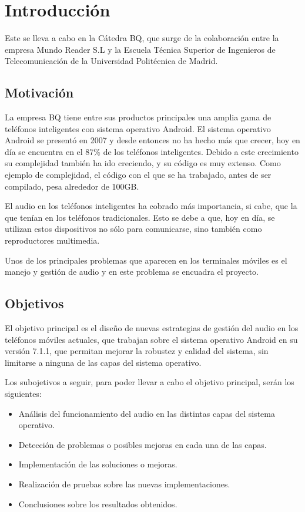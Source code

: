 \chapter{Introducción}
Este  se lleva a cabo en la Cátedra BQ, que surge de la colaboración entre la empresa Mundo Reader S.L y la Escuela Técnica Superior de Ingenieros de Telecomunicación de la Universidad Politécnica de Madrid.

\section{Motivación}
La empresa BQ tiene entre sus productos principales una amplia gama de teléfonos inteligentes con sistema operativo Android. El sistema operativo Android se presentó en 2007 y desde entonces no ha hecho más que crecer, hoy en día se encuentra en el 87\% de los teléfonos inteligentes. Debido a este crecimiento su complejidad también ha ido creciendo, y su código es muy extenso. Como ejemplo de complejidad, el código con el que se ha trabajado, antes de ser compilado, pesa alrededor de 100\gls{GB}.

El audio en los teléfonos inteligentes ha cobrado más importancia, si cabe, que la que tenían en los teléfonos tradicionales. Esto se debe a que, hoy en día, se utilizan estos dispositivos no sólo para comunicarse, sino también como reproductores multimedia.

Unos de los principales problemas que aparecen en los terminales móviles es el manejo y gestión de audio y en este problema se encuadra el proyecto.

\section{Objetivos}
El objetivo principal es el diseño de nuevas estrategias de gestión del audio en los teléfonos móviles actuales, que trabajan sobre el sistema operativo Android en su versión 7.1.1, que permitan mejorar la robustez y calidad del sistema, sin limitarse a ninguna de las capas del sistema operativo.

Los subojetivos a seguir, para poder llevar a cabo el objetivo principal, serán los siguientes:
\begin{itemize}
	\item{Análisis del funcionamiento del audio en las distintas capas del sistema operativo.}
	\item{Detección de problemas o posibles mejoras en cada una de las capas.}
	\item{Implementación de las soluciones o mejoras.}
	\item{Realización de pruebas sobre las nuevas implementaciones.}
	\item{Conclusiones sobre los resultados obtenidos.}
\end{itemize}

